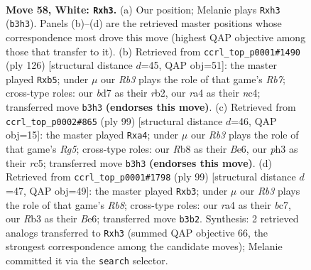 \documentclass[11pt]{article}
\begin{document}
\clearpage

\begin{figure}[p]\centering
\begin{subfigure}{0.46\textwidth}\centering
\resizebox{\linewidth}{!}{%
\newchessgame
\chessboard[
  setfen={1R6/3b2k1/2r5/1p6/r3P1PB/1R5p/2n2P2/7K w - - 1 58},
  showmover=false,
  pgfstyle=straightmove, color=movearrow, markmove={b3-h3}
]}
\caption{}
\end{subfigure}\hfill
\begin{subfigure}{0.46\textwidth}\centering
\resizebox{\linewidth}{!}{%
\newchessgame
\chessboard[
  setfen={8/1R3p2/5k2/1p6/1Pn1B1p1/4P3/1r3P2/4K3 w - - 8 64},
  showmover=false,
  pgfstyle=straightmove, color=movearrow, markmove={b7-b5}
]}
\caption{}
\end{subfigure}
\\[4pt]
\begin{subfigure}{0.46\textwidth}\centering
\resizebox{\linewidth}{!}{%
\newchessgame
\chessboard[
  setfen={8/4Bp2/4b2k/2R4p/P5rP/2K5/6P1/8 b - - 0 50},
  showmover=false,
  pgfstyle=straightmove, color=movearrow, markmove={g4-a4}
]}
\caption{}
\end{subfigure}\hfill
\begin{subfigure}{0.46\textwidth}\centering
\resizebox{\linewidth}{!}{%
\newchessgame
\chessboard[
  setfen={8/2B2p1k/4b3/p7/2P2R2/1P4P1/4K1P1/1r6 b - - 7 50},
  showmover=false,
  pgfstyle=straightmove, color=movearrow, markmove={b1-b3}
]}
\caption{}
\end{subfigure}
\caption{\textbf{Move 58, White: \texttt{Rxh3}.} (a) Our position; Melanie plays \texttt{Rxh3} (\texttt{b3h3}). Panels (b)--(d) are the retrieved master positions whose correspondence most drove this move (highest QAP objective among those that transfer to it). (b) Retrieved from \texttt{ccrl\_top\_p0001\#1490} (ply 126) [structural distance $d$=45, QAP obj=51]: the master played \texttt{Rxb5}; under $\mu$ our \emph{Rb3} plays the role of that game's \emph{Rb7}; cross-type roles: our \emph{b}d7 as their \emph{r}b2, our \emph{r}a4 as their \emph{n}c4; transferred move \texttt{b3h3} \textbf{(endorses this move)}. (c) Retrieved from \texttt{ccrl\_top\_p0002\#865} (ply 99) [structural distance $d$=46, QAP obj=15]: the master played \texttt{Rxa4}; under $\mu$ our \emph{Rb3} plays the role of that game's \emph{Rg5}; cross-type roles: our \emph{R}b8 as their \emph{B}e6, our \emph{p}h3 as their \emph{r}c5; transferred move \texttt{b3h3} \textbf{(endorses this move)}. (d) Retrieved from \texttt{ccrl\_top\_p0001\#1798} (ply 99) [structural distance $d$=47, QAP obj=49]: the master played \texttt{Rxb3}; under $\mu$ our \emph{Rb3} plays the role of that game's \emph{Rb8}; cross-type roles: our \emph{r}a4 as their \emph{b}c7, our \emph{R}b3 as their \emph{B}e6; transferred move \texttt{b3b2}. Synthesis: 2 retrieved analogs transferred to \texttt{Rxh3} (summed QAP objective 66, the strongest correspondence among the candidate moves); Melanie committed it via the \texttt{search} selector.}
\label{fig:thought-m114}
\end{figure}
\end{document}
